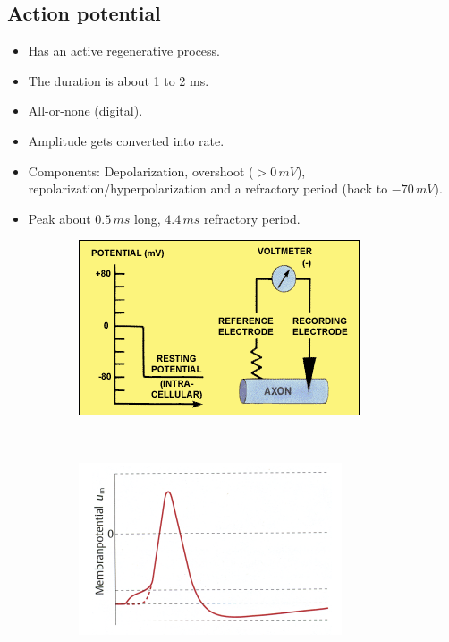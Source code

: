 \documentclass[a4paper, 12pt]{article}
\begin{document}
\subsection{Action potential}
\begin{itemize}[noitemsep,nolistsep]
	\item Has an active regenerative process.
	\item The duration is about 1 to 2 ms.
	\item All-or-none (digital).
	\item Amplitude gets converted into rate.
	\item Components: Depolarization, overshoot ($>0\,mV$), repolarization/hyperpolarization and a refractory period (back to $-70\,mV$).
	\item Peak about $0.5\,ms$ long, $4.4\,ms$ refractory period.
\end{itemize}
\begin{figure}[H]
	\centering
	\begin{subfigure}[b]{0.5\textwidth}
		\centering
		\includegraphics[width=\textwidth]{voltage-source-in-membrane.png}
	\end{subfigure}%
	~
	\begin{subfigure}[b]{0.5\textwidth}
		\centering
		\includegraphics[width=\textwidth]{action_potential_01.png}
	\end{subfigure}
\end{figure}
\end{document}
